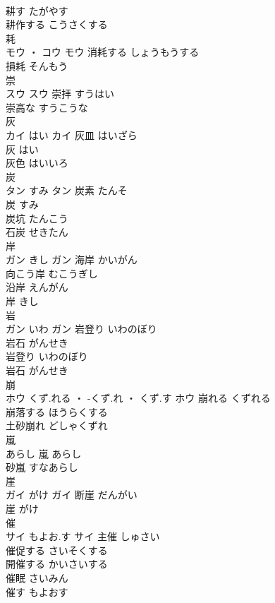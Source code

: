 \documentclass[8pt]{extreport}
\begin{document}
\begin{CJK}{UTF8}{min}
\\	耕す	たがやす	
\\	耕作する	こうさくする	
\\	耗	
\\	モウ ・ コウ		モウ	消耗する	しょうもうする	
\\	損耗	そんもう	
\\	崇	
\\	スウ		スウ	崇拝	すうはい	
\\	崇高な	すうこうな	
\\	灰	
\\	カイ	はい	カイ	灰皿	はいざら	
\\	灰	はい	
\\	灰色	はいいろ	
\\	炭	
\\	タン	すみ	タン	炭素	たんそ	
\\	炭	すみ	
\\	炭坑	たんこう	
\\	石炭	せきたん	
\\	岸	
\\	ガン	きし	ガン	海岸	かいがん	
\\	向こう岸	むこうぎし	
\\	沿岸	えんがん	
\\	岸	きし	
\\	岩	
\\	ガン	いわ	ガン	岩登り	いわのぼり	
\\	岩石	がんせき	
\\	岩登り	いわのぼり	
\\	岩石	がんせき	
\\	崩	
\\	ホウ	くず.れる ・ -くず.れ ・ くず.す	ホウ	崩れる	くずれる	
\\	崩落する	ほうらくする	
\\	土砂崩れ	どしゃくずれ	
\\	嵐	
\\	あらし														嵐	あらし	
\\	砂嵐	すなあらし	
\\	崖	
\\	ガイ	がけ	ガイ	断崖	だんがい	
\\	崖	がけ	
\\	催	
\\	サイ	もよお.す	サイ	主催	しゅさい	
\\	催促する	さいそくする	
\\	開催する	かいさいする	
\\	催眠	さいみん	
\\	催す	もよおす	

\end{CJK}
\end{document}
